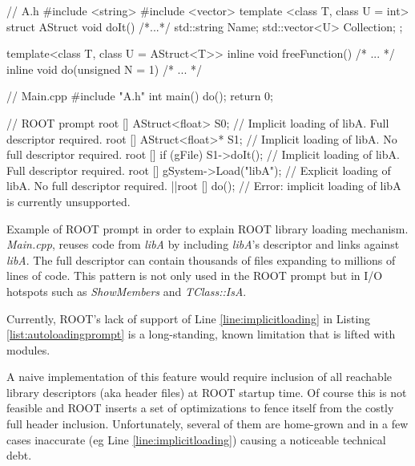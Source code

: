 \documentclass{webofc}
\begin{document}
\begin{listing}[h]
    \noindent
    \begin{minipage}[h]{\textwidth}
    \begin{cppcode*}{}
    // A.h
        #include <string>
        #include <vector>
        template <class T, class U = int> struct AStruct {
          void doIt() { /*...*/ }
          std::string Name; 
          std::vector<U> Collection;
        };

        template<class T, class U = AStruct<T>>
        inline void freeFunction() { /* ... */ }
        inline void do(unsigned N = 1) { /* ... */ }
    
    // Main.cpp
        #include "A.h"
        int main() {
          do();
          return 0;
        }
        
    // ROOT prompt
        root [] AStruct<float> S0;     // Implicit loading of libA. Full descriptor required.
        root [] AStruct<float>* S1;    // Implicit loading of libA. No full descriptor required.
        root [] if (gFile) S1->doIt(); // Implicit loading of libA. Full descriptor required.
        root [] gSystem->Load("libA"); // Explicit loading of libA. No full descriptor required.
        |\label{line:implicitloading}|root [] do();                  // Error: implicit loading of libA is currently unsupported.
    \end{cppcode*}
    \end{minipage}
    \caption{Example of ROOT prompt in order to explain ROOT library loading mechanism. {\it Main.cpp}, reuses code from {\it libA} by including {\it libA}’s descriptor and links against {\it libA}. The full descriptor can contain thousands of files expanding to millions of lines of code. This pattern is not only used in the ROOT prompt but in I/O hotspots such as {\it ShowMembers} and {\it TClass::IsA}.}
    \label{list:autoloadingprompt}
\end{listing}

Currently, ROOT’s lack of support of Line \ref{line:implicitloading} in Listing \ref{list:autoloadingprompt} is a long-standing, known limitation that is lifted with modules.

A naive implementation of this feature would require inclusion of all reachable library descriptors (aka header files) at ROOT startup time. Of course this is not feasible and ROOT inserts a set of optimizations to fence itself from the costly full header inclusion. Unfortunately, several of them are home-grown and in a few cases inaccurate (eg Line \ref{line:implicitloading}) causing a noticeable technical debt.
\end{document}
